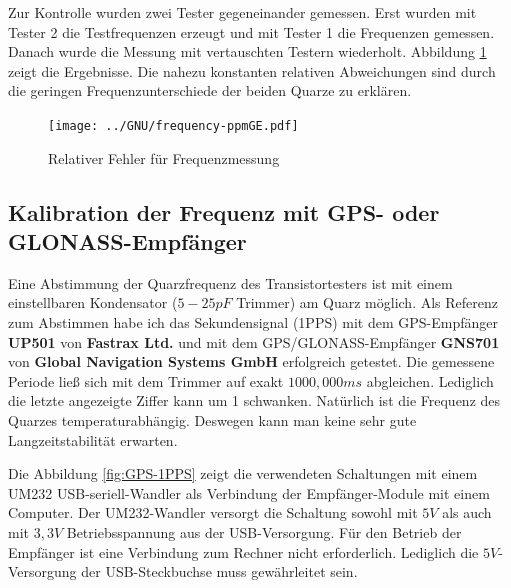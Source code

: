 Zur Kontrolle wurden zwei Tester gegeneinander gemessen.
Erst wurden mit Tester 2 die Testfrequenzen erzeugt und mit Tester 1 die Frequenzen gemessen.
Danach wurde die Messung mit vertauschten Testern wiederholt.
Abbildung \ref{fig:freq-ppm} zeigt die Ergebnisse.
Die nahezu konstanten relativen Abweichungen sind durch die geringen Frequenzunterschiede der beiden Quarze zu erklären.

\begin{figure}[H]
\centering
\texttt{[image: ../GNU/frequency-ppmGE.pdf]}
\caption{Relativer Fehler für Frequenzmessung }
\label{fig:freq-ppm}
\end{figure}

\subsection{Kalibration der Frequenz mit GPS- oder GLONASS-Empfänger}

Eine Abstimmung der Quarzfrequenz des Transistortesters ist mit einem einstellbaren Kondensator (\(5-25pF\) Trimmer) am Quarz möglich.
Als Referenz zum Abstimmen habe ich das Sekundensignal (1PPS) mit dem GPS-Empfänger \textbf {UP501} von \textbf {Fastrax Ltd.} und
mit dem GPS/GLONASS-Empfänger \textbf {GNS701} von \textbf {Global Navigation Systems GmbH} erfolgreich getestet.
Die gemessene Periode ließ sich mit dem Trimmer auf exakt \(1000,000ms\) abgleichen.
Lediglich die letzte angezeigte Ziffer kann um 1 schwanken.
Natürlich ist die Frequenz des Quarzes temperaturabhängig.
Deswegen kann man keine sehr gute Langzeitstabilität erwarten.

Die Abbildung \ref{fig:GPS-1PPS} zeigt die verwendeten Schaltungen mit einem
UM232 USB-seriell-Wandler als Verbindung der Empfänger-Module mit einem Computer.
Der UM232-Wandler versorgt die Schaltung sowohl mit \(5V\) als auch mit \(3,3V\) Betriebsspannung
aus der USB-Versorgung.
Für den Betrieb der Empfänger ist eine Verbindung zum Rechner nicht erforderlich.
Lediglich die \(5V\)-Versorgung der USB-Steckbuchse muss gewährleitet sein.

